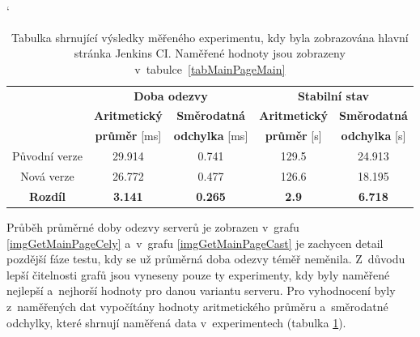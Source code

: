             \begin{table}[h!t]
             \catcode`
             \begin{adjustwidth}{-0.5cm}{}
             \begin{center}
              \begin{tabular}{| c || c | c || c | c |} \hline
                \multirow{3}{*}{}   &    \multicolumn{2}{c||}{\textbf{Doba odezvy}}  &  \multicolumn{2}{c|}{\textbf{Stabilní stav}}\\ \cline{2-5}
                 & \textbf{Aritmetický}  &  \textbf{Směrodatná}  &  \textbf{Aritmetický} &  \textbf{Směrodatná}\\ 
                 & \textbf{průměr} [ms]  &  \textbf{odchylka} [ms]  &  \textbf{průměr} [s]  &  \textbf{odchylka} [s]\\ \hline
                Původní verze & 29.914 &  0.741 &  129.5 &  24.913 \\\hline
                Nová verze & 26.772 &  0.477 &  126.6 &  18.195\\\hline
                \textbf{Rozdíl} &  \textbf{3.141}  &  \textbf{0.265}  &  \textbf{2.9}  &  \textbf{6.718}\\\hline  
              \end{tabular}
              \caption{Tabulka shrnující výsledky měřeného experimentu, kdy byla zobrazována hlavní stránka Jenkins CI. 
                    Naměřené hodnoty jsou zobrazeny v~tabulce~\ref{tabMainPageMain}}
              \label{tabMainPageFinal}
             \end{center}
             \end{adjustwidth}
            \end{table}

            Průběh průměrné doby odezvy serverů je zobrazen v~grafu \ref{imgGetMainPageCely} a~v~grafu
            \ref{imgGetMainPageCast} je zachycen detail pozdější fáze testu, kdy se už průměrná doba odezvy téměř neměnila.
            Z~důvodu lepší čitelnosti grafů jsou vyneseny pouze ty experimenty, kdy byly naměřené nejlepší a~nejhorší hodnoty
            pro danou variantu serveru.
            Pro vyhodnocení byly z~naměřených dat vypočítány hodnoty aritmetického průměru a~směrodatné odchylky,
            které shrnují naměřená data v~experimentech (tabulka \ref{tabMainPageFinal}).

